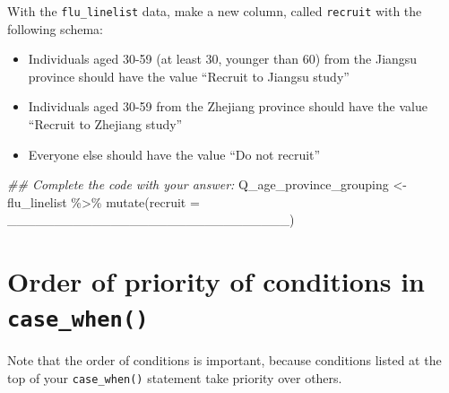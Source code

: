 \documentclass[
  letterpaper,
  DIV=11,
  numbers=noendperiod]{scrreprt}
\newenvironment{Shaded}{\begin{snugshade}}{\end{snugshade}}
\newcommand{\AttributeTok}[1]{\textcolor[rgb]{0.40,0.45,0.13}{#1}}
\newcommand{\DocumentationTok}[1]{\textcolor[rgb]{0.37,0.37,0.37}{\textit{#1}}}
\newcommand{\FunctionTok}[1]{\textcolor[rgb]{0.28,0.35,0.67}{#1}}
\newcommand{\NormalTok}[1]{\textcolor[rgb]{0.00,0.23,0.31}{#1}}
\newcommand{\OtherTok}[1]{\textcolor[rgb]{0.00,0.23,0.31}{#1}}
\newcommand{\SpecialCharTok}[1]{\textcolor[rgb]{0.37,0.37,0.37}{#1}}
\providecommand{\tightlist}{%
  \setlength{\itemsep}{0pt}\setlength{\parskip}{0pt}}\usepackage{longtable,booktabs,array}
\begin{document}
\begin{tcolorbox}[enhanced jigsaw, colframe=quarto-callout-tip-color-frame, rightrule=.15mm, opacityback=0, breakable, coltitle=black, colbacktitle=quarto-callout-tip-color!10!white, bottomrule=.15mm, leftrule=.75mm, toprule=.15mm, arc=.35mm, bottomtitle=1mm, colback=white, left=2mm, opacitybacktitle=0.6, titlerule=0mm, title=\textcolor{quarto-callout-tip-color}{\faLightbulb}\hspace{0.5em}{Practice}, toptitle=1mm]

With the \texttt{flu\_linelist} data, make a new column, called
\texttt{recruit} with the following schema:

\begin{itemize}
\tightlist
\item
  Individuals aged 30-59 (at least 30, younger than 60) from the Jiangsu
  province should have the value ``Recruit to Jiangsu study''
\item
  Individuals aged 30-59 from the Zhejiang province should have the
  value ``Recruit to Zhejiang study''
\item
  Everyone else should have the value ``Do not recruit''
\end{itemize}

\begin{Shaded}
\begin{Highlighting}[]
\DocumentationTok{\#\# Complete the code with your answer:}
\NormalTok{Q\_age\_province\_grouping }\OtherTok{\textless{}{-}} 
\NormalTok{  flu\_linelist }\SpecialCharTok{\%\textgreater{}\%} 
  \FunctionTok{mutate}\NormalTok{(}\AttributeTok{recruit =}\NormalTok{ \_\_\_\_\_\_\_\_\_\_\_\_\_\_\_\_\_\_\_\_\_\_\_\_\_\_\_\_\_\_)}
\end{Highlighting}
\end{Shaded}

\end{tcolorbox}

\hypertarget{order-of-priority-of-conditions-in-case_when}{%
\section{\texorpdfstring{Order of priority of conditions in
\texttt{case\_when()}}{Order of priority of conditions in case\_when()}}\label{order-of-priority-of-conditions-in-case_when}}

Note that the order of conditions is important, because conditions
listed at the top of your \texttt{case\_when()} statement take priority
over others.
\end{document}
